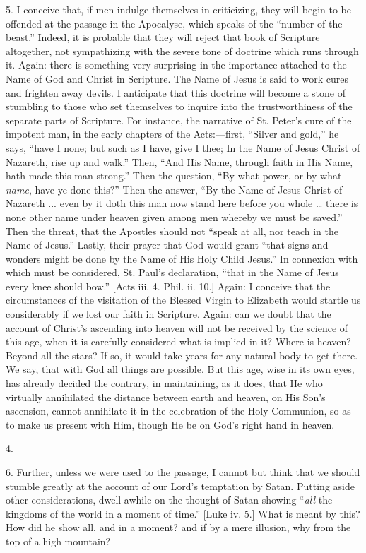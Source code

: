 5. I conceive that, if men indulge themselves in criticizing, they
will begin to be offended at the passage in the Apocalyse, which
speaks of the ``number of the beast.'' Indeed, it is probable
that they will reject that book of Scripture altogether, not
sympathizing with the severe tone of doctrine which runs through it.
Again: there is something very surprising in the importance attached
to the Name of God and Christ in Scripture. The Name of Jesus is said
to work cures and frighten away devils. I anticipate that this
doctrine will become a stone of stumbling to those who set themselves
to inquire into the trustworthiness of the separate parts of
Scripture. For instance, the narrative of St. Peter's cure of the
impotent man, in the early chapters of the Acts:—first, ``Silver
and gold,'' he says, ``have I none; but such as I have, give I
thee; In the Name of Jesus Christ of Nazareth, rise up and walk.''
Then, ``And His Name, through faith in His Name, hath made this
man strong.'' Then the question, ``By what power, or by what \emph{name},
have ye done this?'' Then the answer, ``By the Name of Jesus
Christ of Nazareth ... even by it doth this man now stand here before
you whole … there is none other name under heaven given among men
whereby we must be saved.'' Then the threat, that the Apostles
should not ``speak at all, nor teach in the Name of Jesus.''
Lastly, their prayer that God would grant ``that signs and wonders
might be done by the Name of His Holy Child Jesus.'' In connexion
with which must be considered, St. Paul's declaration, ``that in
the Name of Jesus every knee should bow.'' [Acts iii. 4. Phil. ii.
10.] Again: I conceive that the circumstances of the visitation of the
Blessed Virgin to Elizabeth would startle us considerably if we
lost our faith in Scripture. Again: can we doubt that the account of
Christ's ascending into heaven will not be received by the science of
this age, when it is carefully considered what is implied in it? Where
is heaven? Beyond all the stars? If so, it would take years for any
natural body to get there. We say, that with God all things are
possible. But this age, wise in its own eyes, has already decided the
contrary, in maintaining, as it does, that He who virtually
annihilated the distance between earth and heaven, on His Son's
ascension, cannot annihilate it in the celebration of the Holy
Communion, so as to make us present with Him, though He be on God's
right hand in heaven.

4.

6. Further, unless we were used to the passage, I cannot but think
that we should stumble greatly at the account of our Lord's temptation
by Satan. Putting aside other considerations, dwell awhile on the
thought of Satan showing ``\emph{all} the kingdoms of the world in
a moment of time.'' [Luke iv. 5.] What is meant by this? How did
he show all, and in a moment? and if by a mere illusion, why from the
top of a high mountain?

